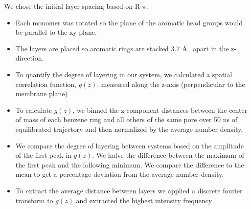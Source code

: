 \documentclass{article}
\newcommand{\angstrom}{\textup{\AA}}
\begin{document}
  We chose the initial layer spacing based on R-$\pi$.
  \begin{itemize}  
    \item Each monomer was rotated so the plane of the aromatic head groups would
    be parallel to the xy plane.
    \item The layers are placed so aromatic rings are stacked 3.7 \angstrom~
    apart in the z-direction.
    \item To quantify the degree of layering in our system, we calculated
    a spatial correlation function, $g(z)$, measured along the z-axis 
    (perpendicular to the membrane plane)
    \item To calculate $g(z)$, we binned the z component distances between 
    the center of mass of each benzene ring and all others of the same pore 
    over 50 ns of equilibrated trajectory and then normalized by the average
    number density.
    \item We compare the degree of layering between systems based on the
    amplitude of the first peak in $g(z)$. We halve the difference between the
    maximum of the first peak and the following minimum. We compare the difference
    to the mean to get a percentage deviation from the average number density.
    \item To extract the average distance between layers we applied a discrete 
    fourier transform to $g(z)$ and extracted the highest intensity frequency 
  \end{itemize}
\end{document}
